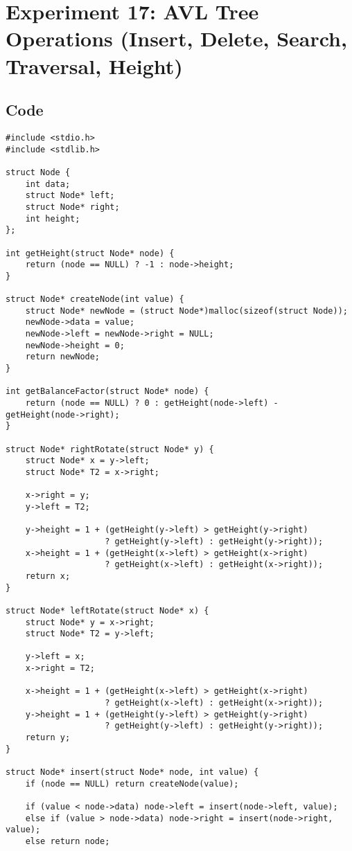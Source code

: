 \documentclass[12pt,a4paper]{article}
\begin{document}
\newpage
\section*{Experiment 17: AVL Tree Operations (Insert, Delete, Search, Traversal, Height)}

\subsection*{Code}
\begin{lstlisting}
#include <stdio.h>
#include <stdlib.h>

struct Node {
    int data;
    struct Node* left;
    struct Node* right;
    int height;
};

int getHeight(struct Node* node) {
    return (node == NULL) ? -1 : node->height;
}

struct Node* createNode(int value) {
    struct Node* newNode = (struct Node*)malloc(sizeof(struct Node));
    newNode->data = value;
    newNode->left = newNode->right = NULL;
    newNode->height = 0;
    return newNode;
}

int getBalanceFactor(struct Node* node) {
    return (node == NULL) ? 0 : getHeight(node->left) - getHeight(node->right);
}

struct Node* rightRotate(struct Node* y) {
    struct Node* x = y->left;
    struct Node* T2 = x->right;

    x->right = y;
    y->left = T2;

    y->height = 1 + (getHeight(y->left) > getHeight(y->right)
                    ? getHeight(y->left) : getHeight(y->right));
    x->height = 1 + (getHeight(x->left) > getHeight(x->right)
                    ? getHeight(x->left) : getHeight(x->right));
    return x;
}

struct Node* leftRotate(struct Node* x) {
    struct Node* y = x->right;
    struct Node* T2 = y->left;

    y->left = x;
    x->right = T2;

    x->height = 1 + (getHeight(x->left) > getHeight(x->right)
                    ? getHeight(x->left) : getHeight(x->right));
    y->height = 1 + (getHeight(y->left) > getHeight(y->right)
                    ? getHeight(y->left) : getHeight(y->right));
    return y;
}

struct Node* insert(struct Node* node, int value) {
    if (node == NULL) return createNode(value);

    if (value < node->data) node->left = insert(node->left, value);
    else if (value > node->data) node->right = insert(node->right, value);
    else return node;


\end{lstlisting}
\end{document}
